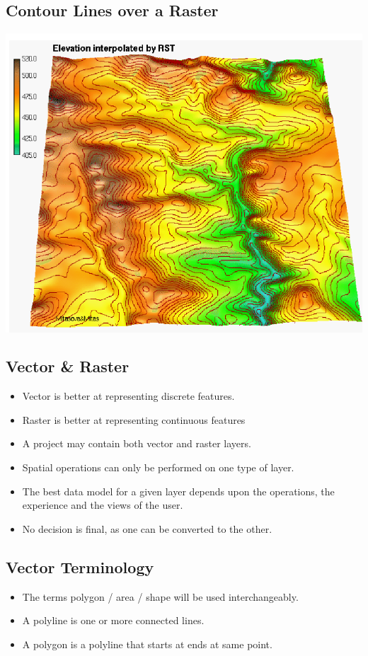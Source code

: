 \documentclass[11pt]{article}
\theoremstyle{definition}
\begin{document}
\subsection{Contour Lines over a Raster}
\includegraphics[width=\textwidth/2]{19.png}

\subsection{Vector \& Raster}
\begin{itemize}
    \item Vector is better at representing discrete
    features.
    \item Raster is better at representing continuous
    features
    \item A project may contain both vector and
    raster layers.
    \item Spatial operations can only be performed
    on one type of layer.
    \item The best data model for a given layer
    depends upon the operations, the
    experience and the views of the user.
    \item No decision is final, as one can be
    converted to the other.
\end{itemize}

\subsection{Vector Terminology}
\begin{itemize}
    \item The terms
    polygon / area /
    shape will be
    used
    interchangeably.
    \item A polyline is one
    or more
    connected lines.
    \item A polygon is a
    polyline that
    starts at ends at
    same point.
\end{itemize}
\end{document}
